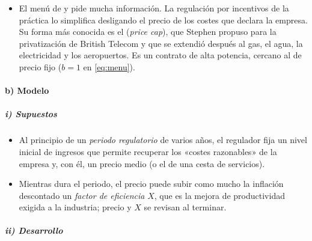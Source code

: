 \documentclass[11pt]{article}
\begin{document}
\begin{itemize}
\item El menú de  y  pide mucha información. La regulación por incentivos de la práctica lo simplifica desligando el precio de los costes que declara la empresa. Su forma más conocida es el  (\emph{price cap}), que Stephen \textcite{Littlechild1983Regulation} propuso para la privatización de British Telecom y que se extendió después al gas, el agua, la electricidad y los aeropuertos. Es un contrato de alta potencia, cercano al de precio fijo ($b=1$ en \eqref{eq:menu}).
\end{itemize}

\paragraph{b) Modelo}

\subparagraph{i) Supuestos}

\begin{itemize}
\item Al principio de un \emph{periodo regulatorio} de varios años, el regulador fija un nivel inicial de ingresos que permite recuperar los «costes razonables» de la empresa y, con él, un precio medio (o el de una cesta de servicios).
\item Mientras dura el periodo, el precio puede subir como mucho la inflación descontado un \emph{factor de eficiencia} $X$, que es la mejora de productividad exigida a la industria; precio y $X$ se revisan al terminar.
\end{itemize}

\subparagraph{ii) Desarrollo}
\end{document}
